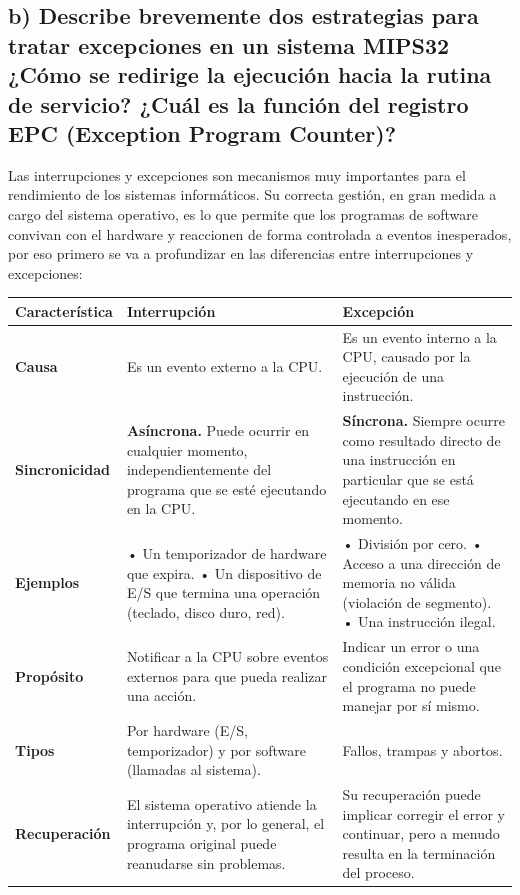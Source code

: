 \documentclass{article}
\begin{document}
\subsection*{b) Describe brevemente dos estrategias para tratar excepciones en un sistema MIPS32 ¿Cómo se redirige la ejecución hacia la rutina de servicio? ¿Cuál es la función del registro EPC (Exception Program Counter)?}

\quad

{Las interrupciones y excepciones son mecanismos muy importantes para el rendimiento de los sistemas informáticos. Su correcta gestión, en gran medida a cargo del sistema operativo, es lo que permite que los programas de software convivan con el hardware y reaccionen de forma controlada a eventos inesperados, por eso primero se va a profundizar en las diferencias entre interrupciones y excepciones:}

\quad

\begin{table}[h!]

    \label{tab:diff_excepciones_interrupciones}
    \begin{tabularx}{\textwidth}{p{2cm} >{\raggedright\arraybackslash}X >{\raggedright\arraybackslash}X}
    \toprule
    \textbf{Característica} & \textbf{Interrupción} & \textbf{Excepción} \\
    \midrule
    \textbf{Causa} & Es un evento externo a la CPU. & Es un evento interno a la CPU, causado por la ejecución de una instrucción. \\
    \midrule
    \textbf{Sincronicidad}& \textbf{Asíncrona.} Puede ocurrir en cualquier momento, independientemente del programa que se esté ejecutando en la CPU. & \textbf{Síncrona.} Siempre ocurre como resultado directo de una instrucción en particular que se está ejecutando en ese momento. \\
    \midrule
    \textbf{Ejemplos} & • Un temporizador de hardware que expira. \newline • Un dispositivo de E/S que termina una operación (teclado, disco duro, red). & • División por cero. \newline • Acceso a una dirección de memoria no válida (violación de segmento). \newline • Una instrucción ilegal. \\
    \midrule
    \textbf{Propósito} & Notificar a la CPU sobre eventos externos para que pueda realizar una acción. & Indicar un error o una condición excepcional que el programa no puede manejar por sí mismo. \\
    \midrule
    \textbf{Tipos} & Por hardware (E/S, temporizador) y por software (llamadas al sistema). & Fallos, trampas y abortos. \\
    \midrule
    \textbf{Recuperación} & El sistema operativo atiende la interrupción y, por lo general, el programa original puede reanudarse sin problemas. & Su recuperación puede implicar corregir el error y continuar, pero a menudo resulta en la terminación del proceso. \\
    \bottomrule
    \end{tabularx}
\end{table}
\newpage
\end{document}
